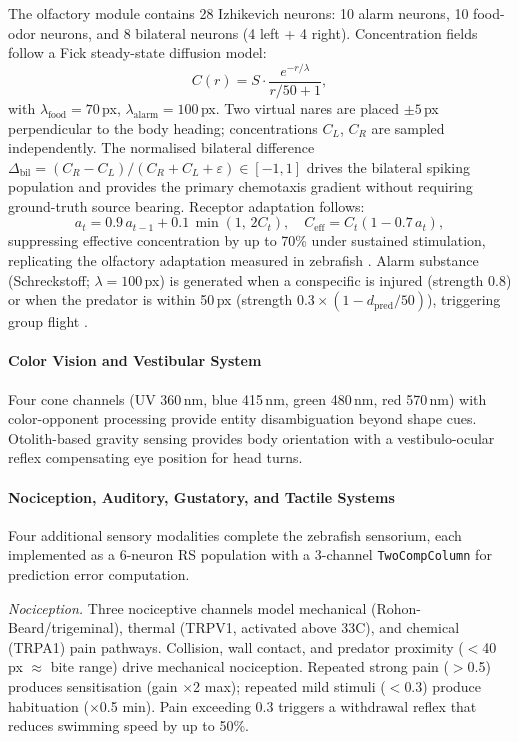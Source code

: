 \documentclass[12pt]{article}
\begin{document}
The olfactory module contains 28 Izhikevich neurons: 10 alarm neurons,
10 food-odor neurons, and 8 bilateral neurons (4 left + 4 right).
Concentration fields follow a Fick steady-state diffusion model:
\begin{equation}\label{eq:fick}
  C(r) = S \cdot \frac{e^{-r/\lambda}}{r/50 + 1},
\end{equation}
with $\lambda_\text{food} = 70$\,px, $\lambda_\text{alarm} = 100$\,px.
Two virtual nares are placed $\pm 5$\,px perpendicular to the
body heading; concentrations $C_L$, $C_R$ are sampled independently.
The normalised bilateral difference
$\Delta_\text{bil} = (C_R - C_L)/(C_R + C_L + \varepsilon) \in [-1,1]$
drives the bilateral spiking population and provides the primary
chemotaxis gradient without requiring ground-truth source bearing.
Receptor adaptation follows:
\begin{equation}\label{eq:adapt}
  a_t = 0.9\,a_{t-1} + 0.1\,\min(1,\,2C_t), \quad
  C_\text{eff} = C_t(1 - 0.7\,a_t),
\end{equation}
suppressing effective concentration by up to 70\% under sustained
stimulation, replicating the olfactory adaptation measured in zebrafish
\citep{krishnan2014}.
Alarm substance (Schreckstoff; $\lambda = 100$\,px) is generated when
a conspecific is injured (strength 0.8) or when the predator is within
50\,px (strength $0.3 \times (1 - d_\text{pred}/50)$), triggering
group flight \citep{jesuthasan2012}.

\paragraph{Color Vision and Vestibular System}

Four cone channels (UV 360\,nm, blue 415\,nm, green 480\,nm,
red 570\,nm) with color-opponent processing provide entity
disambiguation beyond shape cues.
Otolith-based gravity sensing provides body orientation with a
vestibulo-ocular reflex compensating eye position for head turns.

\paragraph{Nociception, Auditory, Gustatory, and Tactile Systems}

Four additional sensory modalities complete the zebrafish sensorium,
each implemented as a 6-neuron RS population with a 3-channel
\texttt{TwoCompColumn} for prediction error computation.

\emph{Nociception.}
Three nociceptive channels model mechanical (Rohon-Beard/trigeminal),
thermal (TRPV1, activated above 33\textdegree{}C), and chemical
(TRPA1) pain pathways.
Collision, wall contact, and predator proximity ($<$40\,px $\approx$
bite range) drive mechanical nociception.
Repeated strong pain ($>$0.5) produces sensitisation (gain $\times$2
max); repeated mild stimuli ($<$0.3) produce habituation ($\times$0.5
min).
Pain exceeding 0.3 triggers a withdrawal reflex that reduces swimming
speed by up to 50\%.
\end{document}
